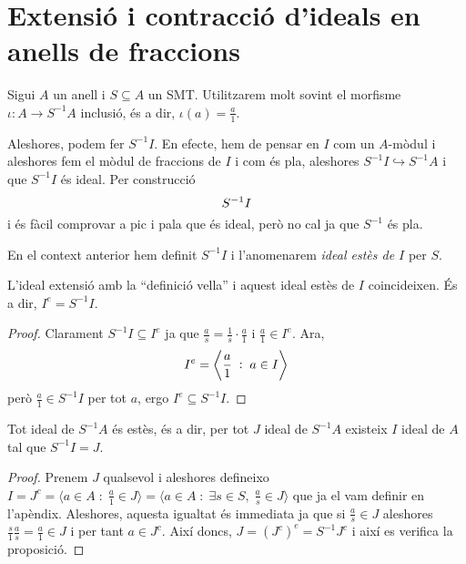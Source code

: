 \documentclass[../../../main.tex]{subfiles}
\begin{document}
\section{Extensió i contracció d'ideals en anells de fraccions}


\begin{defi}
\label{def:morfismeInclusioAnellFraccions} Sigui $A$ un anell i $S\subseteq A$ un SMT. Utilitzarem molt sovint el morfisme $\iota:A\to S^{-1}A$ inclusió, és a dir, $\iota(a) = \frac{a}{1}$.
\end{defi}

Aleshores, podem fer $S^{-1}I$. En efecte, hem de pensar en $I$ com un $A$-mòdul i aleshores fem el mòdul de fraccions de $I$ i com és pla, aleshores $S^{-1}I\hookrightarrow S^{-1}A$ i que $S^{-1}I$ és ideal. Per construcció
\begin{equation}
    \notag
    S^{-1}I
\end{equation}
i és fàcil comprovar a pic i pala que és ideal, però no cal ja que $S^{-1}$ és pla.

\begin{defi}
\label{def:idealExtensio} En el context anterior hem definit $S^{-1}I$ i l'anomenarem \textit{ideal estès de $I$} per $S$.
\end{defi}

\begin{prop}
L'ideal extensió amb la ``definició vella'' i aquest ideal estès de $I$ coincideixen. És a dir, $I^{e} = S^{-1}I$.
\end{prop}
\begin{proof}
Clarament $S^{-1}I\subseteq I^{e}$ ja que $\frac{a}{s}=\frac{1}{s}\cdotp\frac{a}{1}$ i $\frac{a}{1}\in I^{e}$. Ara,
\begin{equation}
    \notag
    I^{e} = \left\langle \frac{a}{1}\;:\;a\in I\right\rangle
\end{equation}
però $\frac{a}{1}\in S^{-1}I$ per tot $a$, ergo $I^{e}\subseteq S^{-1}I$.
\end{proof}


\begin{prop}
\label{prop:totIdealDeSAEsEstes} Tot ideal de $S^{-1}A$ és estès, és a dir, per tot $J$ ideal de $S^{-1}A$ existeix $I$ ideal de $A$ tal que $S^{-1}I = J$.
\end{prop}
\begin{proof}
Prenem $J$ qualsevol i aleshores defineixo $I = J^c = \langle a\in A\;:\;\frac{a}{1}\in J\rangle = \langle a\in A\;:\;\exists s\in S,\;\frac{a}{s}\in J\rangle$ que ja el vam definir en l'apèndix. Aleshores, aquesta igualtat és immediata ja que si $\frac{a}{s}\in J$ aleshores $\frac{s}{1}\frac{a}{s} = \frac{a}{1}\in J$ i per tant $a\in J^c$. Així doncs, $J = (J^c)^{e} = S^{-1}J^c$ i així es verifica la proposició.
\end{proof}
\end{document}
